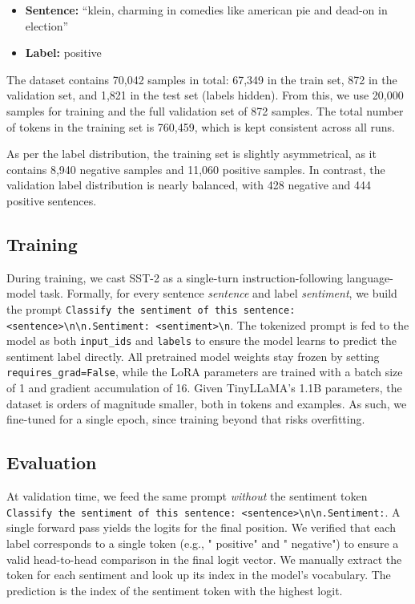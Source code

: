\documentclass[a4paper,10pt,twocolumn,english]{article}
\begin{document}
\begin{itemize}
    \item \textbf{Sentence:} ``klein, charming in comedies like american pie and dead-on in election''
    \item \textbf{Label:} positive
\end{itemize}

The dataset contains 70,042 samples in total: 67,349 in the train set, 872 in the validation set, and 1,821 in the test set (labels hidden). From this, we use 20,000 samples for training and the full validation set of 872 samples. The total number of tokens in the training set is 760,459, which is kept consistent across all runs.

As per the label distribution, the training set is slightly asymmetrical, as it contains 8,940 negative samples and 11,060 positive samples. In contrast, the validation label distribution is nearly balanced, with 428 negative and 444 positive sentences.

\subsection{Training} During training, we cast SST-2 as a single-turn instruction-following language-model task. Formally, for every sentence \textit{sentence} and label \textit{sentiment}, we build the prompt \texttt{Classify the sentiment of this sentence: <sentence>\textbackslash n\textbackslash n.Sentiment: <sentiment>\textbackslash n}. The tokenized prompt is fed to the model as both \texttt{input\_ids} and \texttt{labels} to ensure the model learns to predict the sentiment label directly. All pretrained model weights stay frozen by setting \texttt{requires\_grad=False}, while the LoRA parameters are trained with a batch size of 1 and gradient accumulation of 16. Given TinyLLaMA's 1.1B parameters, the dataset is orders of magnitude smaller, both in tokens and examples. As such, we fine-tuned for a single epoch, since training beyond that risks overfitting.

\subsection{Evaluation} At validation time, we feed the same prompt \emph{without} the sentiment token \texttt{Classify the sentiment of this sentence: <sentence>\textbackslash n\textbackslash n.Sentiment:}. A single forward pass yields the logits for the final position. We verified that each label corresponds to a single token (e.g., " positive" and " negative") to ensure a valid head-to-head comparison in the final logit vector. We manually extract the token for each sentiment and look up its index in the model's vocabulary. The prediction is the index of the sentiment token with the highest logit.
\end{document}
